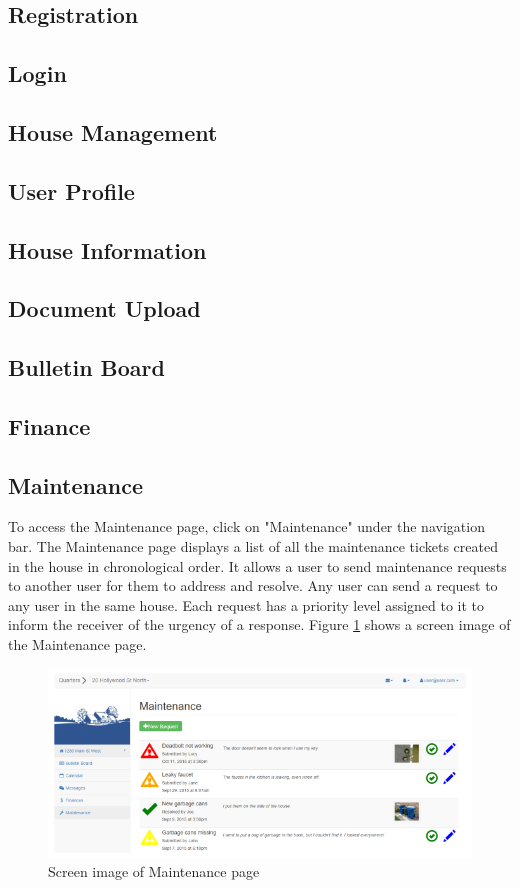 \documentclass[12pt]{article}
\begin{document}
\subsection{Registration}
\subsection{Login}

\subsection{House Management}

\subsection{User Profile}

\subsection{House Information}

\subsection{Document Upload}

\subsection{Bulletin Board}

\subsection{Finance}

\subsection{Maintenance}
To access the Maintenance page, click on "Maintenance" under the navigation bar. The Maintenance page displays a list of all the maintenance tickets created in the house in chronological order. It  allows a user to send maintenance requests to another user for them to address and resolve. Any user can send a request to any user in the same house. Each request has a priority level assigned to it to inform the receiver of the urgency of a response. Figure \ref{fig:maintenance} shows a screen image of the Maintenance page.

\begin{figure}
\centering
\includegraphics[width=\textwidth]{maintenance}
\caption{Screen image of Maintenance page}
\label{fig:maintenance}
\end{figure}
\end{document}
